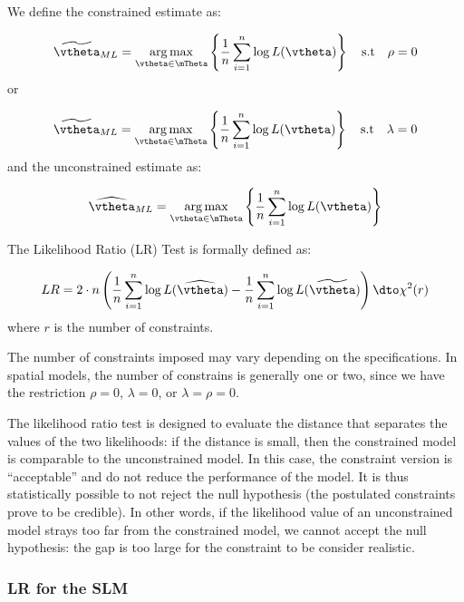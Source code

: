 \documentclass[english,12pt]{book}\usepackage[]{graphicx}\usepackage[]{xcolor}
\begin{document}
We define the constrained estimate as:

\begin{equation}
\widetilde{\vtheta}_{ML}  = \underset{\vtheta\in\mTheta}{\arg\max}\left\lbrace \frac{1}{n}\sum_{i = 1}^n\log L(\vtheta) \right\rbrace\quad\mbox{s.t}\quad \rho = 0
\end{equation}
%
or 

\begin{equation}
\widetilde{\vtheta}_{ML}  = \underset{\vtheta\in\mTheta}{\arg\max}\left\lbrace \frac{1}{n}\sum_{i = 1}^n\log L(\vtheta) \right\rbrace\quad\mbox{s.t}\quad \lambda = 0
\end{equation}
%
and the unconstrained estimate as:

\begin{equation}
\widehat{\vtheta}_{ML}  = \underset{\vtheta\in\mTheta}{\arg\max}\left\lbrace \frac{1}{n}\sum_{i = 1}^n\log L(\vtheta) \right\rbrace
\end{equation}

\begin{definition}
The Likelihood Ratio (LR) Test is formally defined as:

\begin{equation}\label{eq:def_LR}
LR = 2\cdot n\left(\frac{1}{n}\sum_{i = 1}^n\log L(\widehat{\vtheta})-\frac{1}{n}\sum_{i = 1}^n\log L(\widetilde{\vtheta})\right)\dto \chi^2(r)
\end{equation}
%
where $r$ is the number of constraints.
\end{definition}

The number of constraints imposed may vary depending on the specifications. In spatial models, the number of constrains is generally one or two, since we have the restriction $\rho = 0$, $\lambda = 0$, or $\lambda = \rho = 0$.

The likelihood ratio test is designed to evaluate the distance that separates the values of the two likelihoods: if the distance is small, then the constrained model is comparable to the unconstrained model. In this case, the constraint version is ``acceptable'' and do not reduce the performance of the model. It is thus statistically possible to not reject the null hypothesis (the postulated constraints prove to be credible). In other words, if the likelihood value of an unconstrained model strays too far from the constrained model, we cannot accept the null hypothesis: the gap is too large for the constraint to be consider realistic. 

\subsubsection{LR for the SLM}
\end{document}
